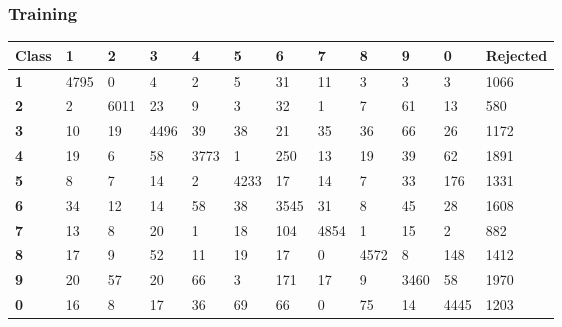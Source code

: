 \documentclass[
  a4paper,            %
  DIV=10,             %
  oneside,            %
  BCOR=5mm,           %
  parskip=half,       %
  numbers=noenddot,   %
  bibtotoc,           %
  listof=totoc,        %
  article
]{scrreprt}
\begin{document}
\subsubsection{Training}
\begin{center}
  \begin{tabular}{|p{1cm}|p{1cm}|p{1cm}|p{1cm}|p{1cm}|p{1cm}|p{1cm}|p{1cm}|p{1cm}|p{1cm}|p{1cm}|p{1.7cm}|}
    \hline
    \textbf{Class} & \textbf{1} & \textbf{2} & \textbf{3} & \textbf{4} & \textbf{5} & \textbf{6} & \textbf{7} & \textbf{8} & \textbf{9} & \textbf{0} & \textbf{Rejected} \\
    \hline
    \textbf{1} & 4795 & 0 & 4 & 2 & 5 & 31 & 11 & 3 & 3 & 3 & 1066 \\
    \hline
    \textbf{2} & 2 & 6011 & 23 & 9 & 3 & 32 & 1 & 7 & 61 & 13 & 580 \\
    \hline
    \textbf{3} & 10 & 19 & 4496 & 39 & 38 & 21 & 35 & 36 & 66 & 26 & 1172 \\
    \hline
    \textbf{4} & 19 & 6 & 58 & 3773 & 1 & 250 & 13 & 19 & 39 & 62 & 1891 \\
    \hline
    \textbf{5} & 8 & 7 & 14 & 2 & 4233 & 17 & 14 & 7 & 33 & 176 & 1331 \\
    \hline
    \textbf{6} & 34 & 12 & 14 & 58 & 38 & 3545 & 31 & 8 & 45 & 28 & 1608 \\
    \hline
    \textbf{7} & 13 & 8 & 20 & 1 & 18 & 104 & 4854 & 1 & 15 & 2 & 882 \\
    \hline
    \textbf{8} & 17 & 9 & 52 & 11 & 19 & 17 & 0 & 4572 & 8 & 148 & 1412 \\
    \hline
    \textbf{9} & 20 & 57 & 20 & 66 & 3 & 171 & 17 & 9 & 3460 & 58 & 1970 \\
    \hline
    \textbf{0} & 16 & 8 & 17 & 36 & 69 & 66 & 0 & 75 & 14 & 4445 & 1203 \\
    \hline
  \end{tabular}
\end{center}
\end{document}

